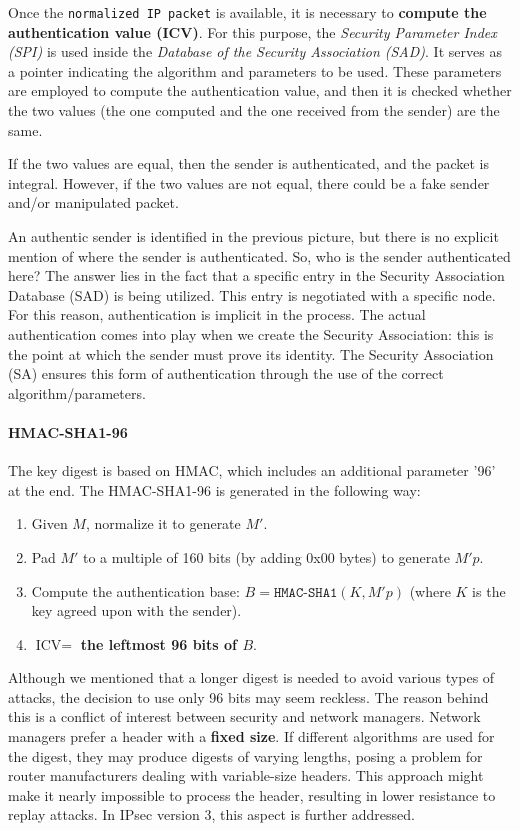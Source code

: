 Once the \texttt{normalized IP packet} is available, it is necessary to \textbf{compute the authentication value (ICV)}. For this purpose, the \textit{Security Parameter Index (SPI)} is used inside the \textit{Database of the Security Association (SAD)}. It serves as a pointer indicating the algorithm and parameters to be used. These parameters are employed to compute the authentication value, and then it is checked whether the two values (the one computed and the one received from the sender) are the same.

If the two values are equal, then the sender is authenticated, and the packet is integral. However, if the two values are not equal, there could be a fake sender and/or manipulated packet.

An authentic sender is identified in the previous picture, but there is no explicit mention of where the sender is authenticated. So, who is the sender authenticated here? The answer lies in the fact that a specific entry in the Security Association Database (SAD) is being utilized. This entry is negotiated with a specific node. For this reason, authentication is implicit in the process. The actual authentication comes into play when we create the Security Association: this is the point at which the sender must prove its identity. The Security Association (SA) ensures this form of authentication through the use of the correct algorithm/parameters.


\paragraph{HMAC-SHA1-96}
The key digest is based on HMAC, which includes an additional parameter '96' at the end. The HMAC-SHA1-96 is generated in the following way:

\begin{enumerate}
	\item Given $M$, normalize it to generate $M'$.
	\item Pad $M'$ to a multiple of 160 bits (by adding 0x00 bytes) to generate $M'p$.
	\item Compute the authentication base: $B = \texttt{HMAC-SHA1}(K, M'p)$ (where $K$ is the key agreed upon with the sender).
	\item $\text{ICV} = $ \textbf{the leftmost 96 bits of $B$}.
\end{enumerate}

Although we mentioned that a longer digest is needed to avoid various types of attacks, the decision to use only 96 bits may seem reckless. The reason behind this is a conflict of interest between security and network managers. Network managers prefer a header with a \textbf{fixed size}. If different algorithms are used for the digest, they may produce digests of varying lengths, posing a problem for router manufacturers dealing with variable-size headers. This approach might make it nearly impossible to process the header, resulting in lower resistance to replay attacks. In IPsec version 3, this aspect is further addressed.

